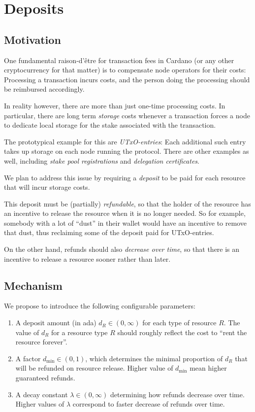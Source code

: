 \documentclass[11pt,a4paper,dvipsnames,twosided]{article}
\begin{document}
\section{Deposits}
\label{deposits}

\subsection{Motivation}

One fundamental raison-d'\^{e}tre for transaction fees in Cardano (or any other
cryptocurrency for that matter) is to compensate node operators for their costs:
Processing a transaction incurs costs, and the person doing the processing
should be reimbursed accordingly.

In reality however, there are more than just one-time processing costs.
In particular, there are long term \emph{storage} costs whenever a transaction
forces a node to dedicate local storage for the stake associated with the
transaction.

The prototypical example for this are \emph{UTxO-entries}: Each additional such entry
takes up storage on each node running the protocol.
There are other examples as well, including \emph{stake pool registrations} and
\emph{delegation certificates}.

We plan to address this issue by requiring a \emph{deposit} to be paid for each
resource that will incur storage costs.

This deposit must be (partially) \emph{refundable},
so that the holder of the resource has an incentive to release the resource when
it is no longer needed. So for example, somebody with a lot of ``dust'' in their
wallet would have an incentive to remove that dust, thus reclaiming some of the
deposit paid for UTxO-entries.

On the other hand, refunds should also \emph{decrease over time}, so that
there is an incentive to release a resource sooner rather than later.

\subsection{Mechanism}

We propose to introduce the following configurable parameters:
\begin{enumerate}
    \item
        A deposit amount (in ada) $d_R\in(0,\infty)$ for each type of resource
        $R$. The value of $d_R$ for a resource type $R$ should roughly reflect
        the cost to ``rent the resource forever''.
    \item
        A factor $d_{\min}\in(0,1)$, which determines the minimal proportion of
        $d_R$ that will be refunded on resource release. Higher value of
        $d_{\min}$ mean higher guaranteed refunds.
    \item
        A decay constant $\lambda\in(0,\infty)$ determining how refunds decrease
        over time. Higher values of $\lambda$ correspond to faster decrease of
        refunds over time.
\end{enumerate}
\end{document}
